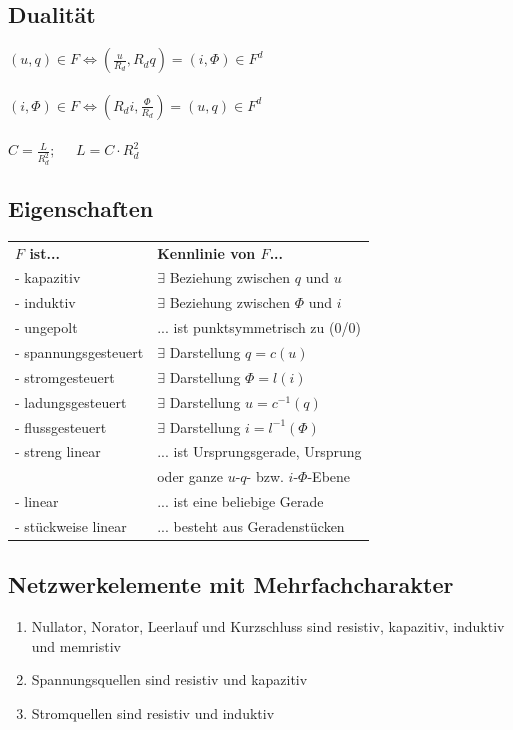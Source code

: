 \documentclass[a4paper,twocolumn,10pt]{article}
\begin{document}
\subsection*{Dualität}
$(u,q)\in F \Leftrightarrow (\frac{u}{R_d},R_dq)=(i,\Phi)\in F^d$\\\\
$(i,\Phi)\in F \Leftrightarrow (R_di,\frac{\Phi}{R_d})=(u,q)\in F^d$\\\\
$C=\frac{L}{R_d^2};\;\;\;\;\;L=C\cdot R_d^2$

\subsection*{Eigenschaften}
\begin{tabular}{ll}
\textbf{$F$ ist...} & \textbf{Kennlinie von $F$...}\\
- kapazitiv & $\exists $ Beziehung zwischen $q$ und $u$\\
- induktiv & $\exists $ Beziehung zwischen $\Phi$ und $i$\\
- ungepolt & ... ist punktsymmetrisch zu (0/0)\\
- spannungsgesteuert & $\exists$ Darstellung $q=c(u)$\\
- stromgesteuert & $\exists$ Darstellung $\Phi=l(i)$\\
- ladungsgesteuert & $\exists$ Darstellung $u=c^{-1}(q)$\\
- flussgesteuert & $\exists$ Darstellung $i=l^{-1}(\Phi)$\\
- streng linear & ... ist Ursprungsgerade, Ursprung\\
 & \;\;\;\;oder ganze $u$-$q$- bzw. $i$-$\Phi$-Ebene\\
- linear & ... ist eine beliebige Gerade\\
- stückweise linear & ... besteht aus Geradenstücken
\end{tabular}

\subsection*{Netzwerkelemente mit Mehrfachcharakter}
\begin{enumerate}[label=-,leftmargin=3mm]
	\item Nullator, Norator, Leerlauf und Kurzschluss sind resistiv, kapazitiv, induktiv und memristiv
	\item Spannungsquellen sind resistiv und kapazitiv
	\item Stromquellen sind resistiv und induktiv
\end{enumerate}
\end{document}
